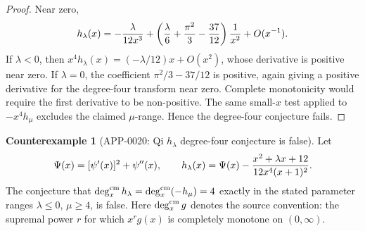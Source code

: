 \documentclass[11pt]{article}
\numberwithin{equation}{section}
\theoremstyle{definition}
\newtheorem{counterexample}[theorem]{Counterexample}
\theoremstyle{remark}
\newcommand{\1}{\mathbf 1}
\begin{document}
\begin{proof}
Near zero,
\[
 h_\lambda(x)=-{\lambda\over 12x^3}
 +\left({\lambda\over6}+{\pi^2\over3}-{37\over12}\right){1\over x^2}
 +O(x^{-1}).
\]
If \(\lambda<0\), then \(x^4h_\lambda(x)=(-\lambda/12)x+O(x^2)\), whose
derivative is positive near zero.  If \(\lambda=0\), the coefficient
\(\pi^2/3-37/12\) is positive, again giving a positive derivative for the
degree-four transform near zero.  Complete monotonicity would require the first
derivative to be non-positive.  The same small-\(x\) test applied to
\(-x^4h_\mu\) excludes the claimed \(\mu\)-range.  Hence the degree-four
conjecture fails.
\end{proof}

\begin{counterexample}[APP-0020: Qi \(h_\lambda\) degree-four conjecture is false]
\label{thm:app20-qi-hlambda}
Let
\[
  \Psi(x)=[\psi'(x)]^2+\psi''(x),\qquad
  h_\lambda(x)=\Psi(x)-
   {x^2+\lambda x+12\over 12x^4(x+1)^2}.
\]
The conjecture that
\(\deg_x^{\rm cm}h_\lambda=\deg_x^{\rm cm}(-h_\mu)=4\) exactly in the stated
parameter ranges \(\lambda\le0\), \(\mu\ge4\), is false.  Here
\(\deg_x^{\rm cm}g\) denotes the source convention: the supremal power \(r\)
for which \(x^rg(x)\) is completely monotone on \((0,\infty)\).


\end{counterexample}
\end{document}
